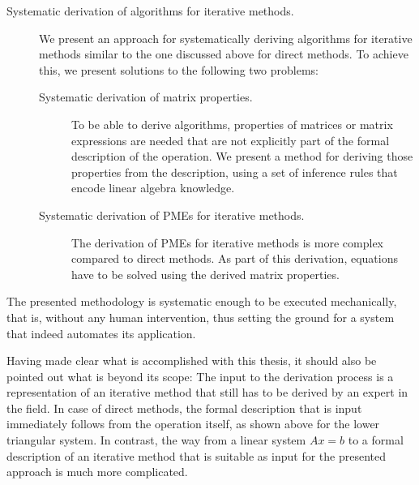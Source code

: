 \begin{description}
\item[Systematic derivation of algorithms for iterative methods.] We present an approach for sys\-tematically deriving algorithms for iterative methods similar to the one discussed above for direct methods. To achieve this, we present solutions to the following two problems:

\begin{description}

\item[Systematic derivation of matrix properties.] To be able to derive algorithms, properties of matrices or matrix expressions are needed that are not explicitly part of the formal description of the operation. We present a method for deriving those properties from the description, using a set of inference rules that encode linear algebra knowledge.

\item[Systematic derivation of PMEs for iterative methods.] The derivation of PMEs for iterative methods is more complex compared to direct methods. As part of this derivation, equations have to be solved using the derived matrix properties.

\end{description}
\end{description}

The presented methodology is systematic enough to be executed mechanically, that is, without any human intervention, thus setting the ground for a system that indeed automates its application.

Having made clear what is accomplished with this thesis, it should also be pointed out what is beyond its scope: The input to the derivation process is a representation of an iterative method that still has to be derived by an expert in the field. In case of direct methods, the formal description that is input immediately follows from the operation itself, as shown above for the lower triangular system. 
In contrast, the way from a linear system $Ax=b$ to a formal description of an iterative method that is suitable as input for the presented approach is much more complicated.

